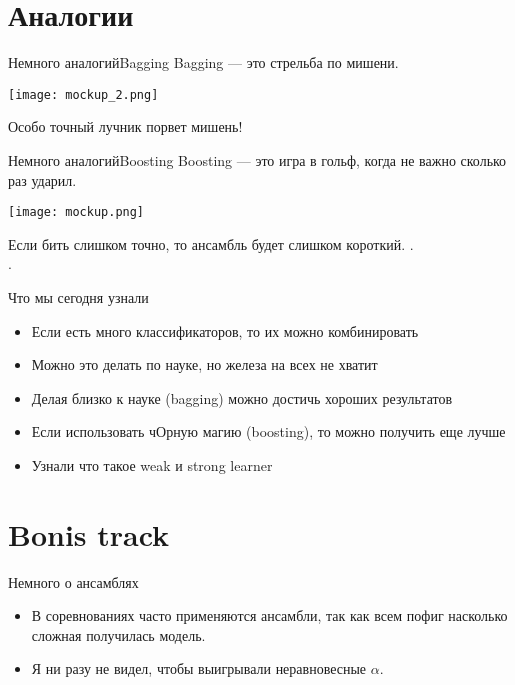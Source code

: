 \documentclass[14pt, fleqn, xcolor={dvipsnames, table}]{beamer}
\begin{document}
\section{Аналогии}

\begin{frame}{Немного аналогий}{Bagging}
Bagging --- это стрельба по мишени.
\begin{center}
\texttt{[image: mockup\_2.png]}
\end{center}
Особо точный лучник порвет мишень!  \\
 
\end{frame}

\begin{frame}{Немного аналогий}{Boosting}
Boosting --- это игра в гольф, когда не важно сколько раз ударил.
\begin{center}
\texttt{[image: mockup.png]}
\end{center}
Если бить слишком точно, то ансамбль будет слишком короткий. .\\
 .
\end{frame}

\begin{frame}{Что мы сегодня узнали}
\begin{itemize}
  \item Если есть много классификаторов, то их можно комбинировать
  \item Можно это делать по науке, но железа на всех не хватит
  \item Делая близко к науке (bagging) можно достичь хороших результатов
  \item Если использовать чОрную магию (boosting), то можно получить еще лучше
  \item Узнали что такое weak и strong learner
\end{itemize}
\end{frame}

\section{Bonis track}

\begin{frame}{Немного о ансамблях}
\begin{itemize}
  \item В соревнованиях часто применяются ансамбли, так как всем пофиг насколько сложная получилась модель.
  \item Я ни разу не видел, чтобы выигрывали неравновесные $\alpha$.
\end{itemize}
\end{frame} 
\end{document}
